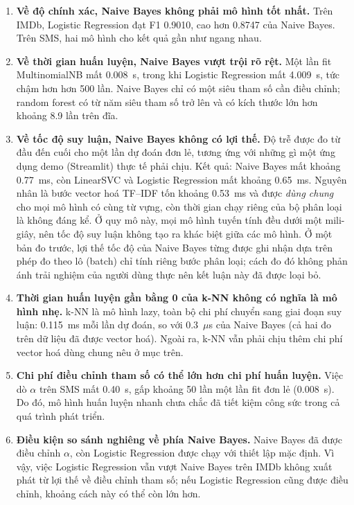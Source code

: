 \documentclass[11pt,a4paper]{article}
\begin{document}
\begin{enumerate}
\item \textbf{Về độ chính xác, Naive Bayes không phải mô hình tốt nhất.} Trên IMDb, Logistic Regression đạt F1 0.9010, cao hơn 0.8747 của Naive Bayes. Trên SMS, hai mô hình cho kết quả gần như ngang nhau.

\item \textbf{Về thời gian huấn luyện, Naive Bayes vượt trội rõ rệt.} Một lần fit MultinomialNB mất 0.008~s, trong khi Logistic Regression mất 4.009~s, tức chậm hơn hơn 500 lần. Naive Bayes chỉ có một siêu tham số cần điều chỉnh; random forest có từ năm siêu tham số trở lên và có kích thước lớn hơn khoảng 8.9 lần trên đĩa.

\item \textbf{Về tốc độ suy luận, Naive Bayes không có lợi thế.} Độ trễ được đo từ đầu đến cuối cho một lần dự đoán đơn lẻ, tương ứng với những gì một ứng dụng demo (Streamlit) thực tế phải chịu. Kết quả: Naive Bayes mất khoảng 0.77~ms, còn LinearSVC và Logistic Regression mất khoảng 0.65~ms. Nguyên nhân là bước vector hoá TF--IDF tốn khoảng 0.53~ms và được \emph{dùng chung} cho mọi mô hình có cùng từ vựng, còn thời gian chạy riêng của bộ phân loại là không đáng kể. Ở quy mô này, mọi mô hình tuyến tính đều dưới một mili-giây, nên tốc độ suy luận không tạo ra khác biệt giữa các mô hình. Ở một bản đo trước, lợi thế tốc độ của Naive Bayes từng được ghi nhận dựa trên phép đo theo lô (batch) chỉ tính riêng bước phân loại; cách đo đó không phản ánh trải nghiệm của người dùng thực nên kết luận này đã được loại bỏ.

\item \textbf{Thời gian huấn luyện gần bằng 0 của k-NN không có nghĩa là mô hình nhẹ.} k-NN là mô hình lazy, toàn bộ chi phí chuyển sang giai đoạn suy luận: 0.115~ms mỗi lần dự đoán, so với 0.3~$\mu$s của Naive Bayes (cả hai đo trên dữ liệu đã được vector hoá). Ngoài ra, k-NN vẫn phải chịu thêm chi phí vector hoá dùng chung nêu ở mục trên.

\item \textbf{Chi phí điều chỉnh tham số có thể lớn hơn chi phí huấn luyện.} Việc dò $\alpha$ trên SMS mất 0.40~s, gấp khoảng 50 lần một lần fit đơn lẻ (0.008~s). Do đó, mô hình huấn luyện nhanh chưa chắc đã tiết kiệm công sức trong cả quá trình phát triển.

\item \textbf{Điều kiện so sánh nghiêng về phía Naive Bayes.} Naive Bayes đã được điều chỉnh $\alpha$, còn Logistic Regression được chạy với thiết lập mặc định. Vì vậy, việc Logistic Regression vẫn vượt Naive Bayes trên IMDb không xuất phát từ lợi thế về điều chỉnh tham số; nếu Logistic Regression cũng được điều chỉnh, khoảng cách này có thể còn lớn hơn.
\end{enumerate}
\end{document}
